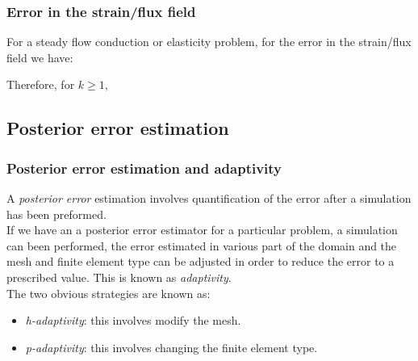\documentclass[handout]{beamer}
\begin{document}
\begin{frame}
\frametitle{Error in the strain/flux field}
For a steady flow conduction or elasticity problem, for the error in the strain/flux field we have:

Therefore, for $k \ge 1$,

\end{frame}

\subsection{Posterior error estimation}
\begin{frame}
\frametitle{Posterior error estimation and adaptivity}
A \textit{posterior error} estimation involves quantification of the error after a simulation has
been preformed.\\

If we have an a posterior error estimator for a particular problem, a simulation can
been performed, the error estimated in various part of the domain and the mesh and
finite element type can be adjusted in order to reduce the error to a prescribed value.
This is known as \textit{adaptivity}. \\

The two obvious strategies are known as:
	\begin{itemize}
		\item \textit{h-adaptivity}: this involves modify the mesh.
		\item \textit{p-adaptivity}: this involves changing the finite element type.
	\end{itemize}
\end{frame}
\end{document}
